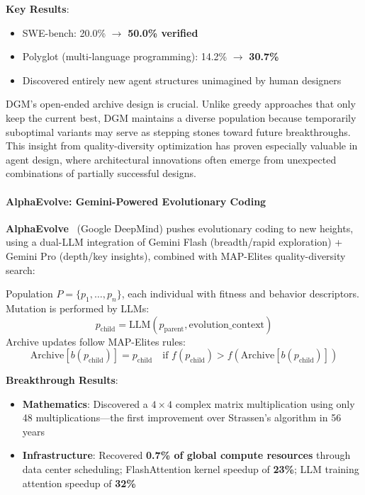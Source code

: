 \textbf{Key Results}:
\begin{itemize}
\item SWE-bench: 20.0\% $\rightarrow$ \textbf{50.0\% verified}
\item Polyglot (multi-language programming): 14.2\% $\rightarrow$ \textbf{30.7\%}
\item Discovered entirely new agent structures unimagined by human designers
\end{itemize}

DGM's open-ended archive design is crucial. Unlike greedy approaches that only keep the current best, DGM maintains a diverse population because temporarily suboptimal variants may serve as stepping stones toward future breakthroughs. This insight from quality-diversity optimization has proven especially valuable in agent design, where architectural innovations often emerge from unexpected combinations of partially successful designs.

\paragraph{AlphaEvolve: Gemini-Powered Evolutionary Coding}

\textbf{AlphaEvolve}~\citep{alphaevolve2025} (Google DeepMind) pushes evolutionary coding to new heights, using a dual-LLM integration of Gemini Flash (breadth/rapid exploration) + Gemini Pro (depth/key insights), combined with MAP-Elites quality-diversity search:

\begin{definition}
Population $P = \{p_1, \ldots, p_n\}$, each individual with fitness and behavior descriptors. Mutation is performed by LLMs:
\begin{equation}
p_{\mathrm{child}} = \mathrm{LLM}(p_{\mathrm{parent}}, \text{evolution\_context})
\label{eq:alphaevolve-mutate}
\end{equation}
Archive updates follow MAP-Elites rules:
\begin{equation}
\text{Archive}[b(p_{\mathrm{child}})] = p_{\mathrm{child}} \quad \text{if } f(p_{\mathrm{child}}) > f(\text{Archive}[b(p_{\mathrm{child}})])
\label{eq:alphaevolve-archive}
\end{equation}
\end{definition}

\textbf{Breakthrough Results}:
\begin{itemize}
\item \textbf{Mathematics}: Discovered a $4\times4$ complex matrix multiplication using only 48 multiplications---the first improvement over Strassen's algorithm in 56 years
\item \textbf{Infrastructure}: Recovered \textbf{0.7\% of global compute resources} through data center scheduling; FlashAttention kernel speedup of \textbf{23\%}; LLM training attention speedup of \textbf{32\%}
\end{itemize}

